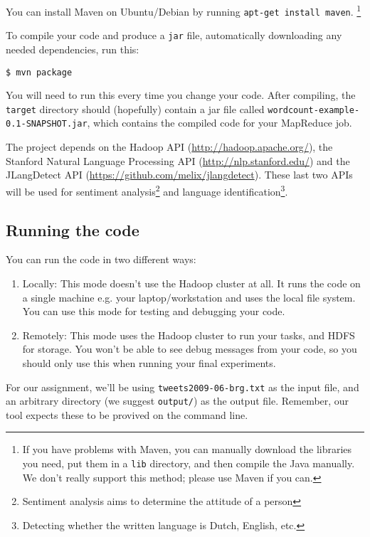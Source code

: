 \documentclass[a4paper,11pt]{article}
\begin{document}
  You can install Maven on Ubuntu/Debian by running \texttt{apt-get install maven}.
  \footnote{If you have problems with Maven, you can manually download the libraries you need, put them in a \texttt{lib} directory, and then compile
  the Java manually. We don't really support this method; please use Maven if you can.}

  To compile your code and produce a \texttt{jar} file, automatically downloading any needed dependencies, run this:
\begin{lstlisting}
$ mvn package
\end{lstlisting}

  You will need to run this every time you change your code. After compiling, the \texttt{target} directory should (hopefully) contain a jar file called \texttt{wordcount-example-0.1-SNAPSHOT.jar}, which contains the compiled code for your MapReduce job.


  The project depends on the Hadoop API (\url{http://hadoop.apache.org/}), the Stanford Natural Language Processing API (\url{http://nlp.stanford.edu/}) and the JLangDetect API (\url{https://github.com/melix/jlangdetect}). These last two APIs will be used for sentiment analysis\footnote{Sentiment analysis aims to determine the attitude of a person} and language identification\footnote{Detecting whether the written language is Dutch, English, etc. }.

   \subsection{Running the code}

  You can run the code in two different ways:

  \begin{enumerate}
    \item Locally: This mode doesn't use the Hadoop cluster at all. It runs the code on a single machine e.g. your laptop/workstation and uses the local file system. You can use this mode for testing and debugging your code.
    \item Remotely: This mode uses the Hadoop cluster to run your tasks, and HDFS for storage. You won't be able to see debug messages from your code, so you should only use this when running your final experiments.
  \end{enumerate}

For our assignment, we'll be using \texttt{tweets2009-06-brg.txt} as the input
file, and an arbitrary directory (we suggest \texttt{output/}) as the output file. Remember, our tool
expects these to be provived on the command line.
\end{document}

